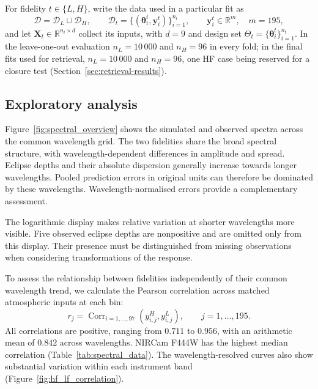 \documentclass[12pt, letterpaper, oneside]{article}
\begin{document}
For fidelity $t\in\{L,H\}$, write the data used in a particular fit as
\begin{equation}
\mathcal D=\mathcal D_L\cup\mathcal D_H,
\qquad
\mathcal D_t=\{(\bm\theta_i^t,\mathbf y_i^t)\}_{i=1}^{n_t},
\qquad \mathbf y_i^t\in\mathbb R^m,
\quad m=195,
\label{eq:inversion-training-data}
\end{equation}
and let $\mathbf X_t\in\mathbb R^{n_t\times d}$ collect its inputs,
with $d=9$ and design set
$\Theta_t=\{\bm\theta_i^t\}_{i=1}^{n_t}$.
In the leave-one-out evaluation $n_L=10\,000$ and $n_H=96$ in every fold; in
the final fits used for retrieval, $n_L=10\,000$ and $n_H=96$, one HF case
being reserved for a closure test (Section~\ref{sec:retrieval-results}).

\subsection{Exploratory analysis}
\label{sec:eda}

Figure~\ref{fig:spectral_overview} shows the simulated and observed spectra
across the common wavelength grid. The two fidelities share the broad spectral
structure, with wavelength-dependent differences in amplitude and spread.
Eclipse depths and their absolute dispersion generally increase towards longer
wavelengths. Pooled prediction errors in original units can therefore be
dominated by these wavelengths. Wavelength-normalised errors provide a
complementary assessment.

The logarithmic display makes relative variation at shorter wavelengths more
visible. Five observed eclipse depths are nonpositive and are omitted only from
this display. Their presence must be distinguished from missing observations
when considering transformations of the response.

To assess the relationship between fidelities independently of their common
wavelength trend, we calculate the Pearson correlation
across matched atmospheric inputs at each bin:
\[
    r_j
    =
    \operatorname{Corr}_{i=1,\ldots,97}
    \left(y^H_{i,j},y^L_{i,j}\right),
    \qquad j=1,\ldots,195.
\]
All correlations are positive, ranging from $0.711$ to $0.956$, with an
arithmetic mean of $0.842$ across wavelengths. NIRCam F444W has the highest
median correlation (Table~\ref{tab:spectral_data}). The wavelength-resolved
curves also show substantial variation within each instrument band
(Figure~\ref{fig:hf_lf_correlation}).
\end{document}
